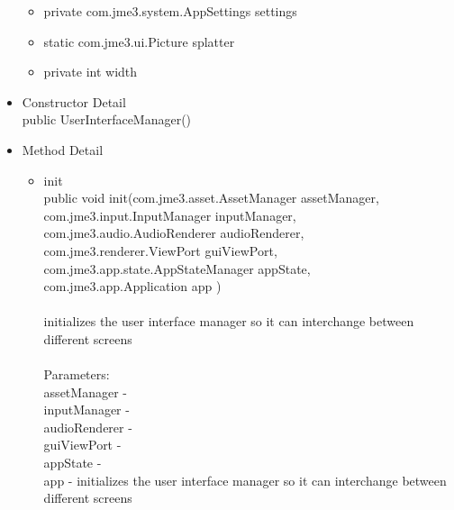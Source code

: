 \documentclass[letterpaper]{article}
\begin{document}
\begin{itemize}
\begin{itemize}
\item private com.jme3.system.AppSettings 	settings 
 
\item static com.jme3.ui.Picture 	splatter 
 
\item private int 	width 										\end{itemize}
								\item	Constructor Detail \\
										public UserInterfaceManager()
								\item	Method Detail
										\begin{itemize}
											\item	init \\
													public void init(com.jme3.asset.AssetManager assetManager, \\
				        com.jme3.input.InputManager inputManager, \\
				        com.jme3.audio.AudioRenderer audioRenderer, \\
				        com.jme3.renderer.ViewPort guiViewPort, \\
				        com.jme3.app.state.AppStateManager appState, \\
				        com.jme3.app.Application app ) \\ \\
				        initializes the user interface manager so it can interchange between different screens \\ \\
													Parameters: \\
													assetManager - \\
													inputManager - \\
													audioRenderer - \\
													guiViewPort - \\
													appState - \\
													app - initializes the user interface manager so it can interchange between different screens \\



\end{itemize}
\end{itemize}
\end{document}
